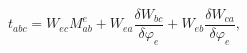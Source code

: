 \begin{equation}
t_{abc}=W_{ec}M_{ab}^{e}+W_{ea}\frac{\delta W_{bc}}{\delta \varphi _{e}}%
+W_{eb}\frac{\delta W_{ca}}{\delta \varphi _{e}},  \label{c21}
\end{equation}

